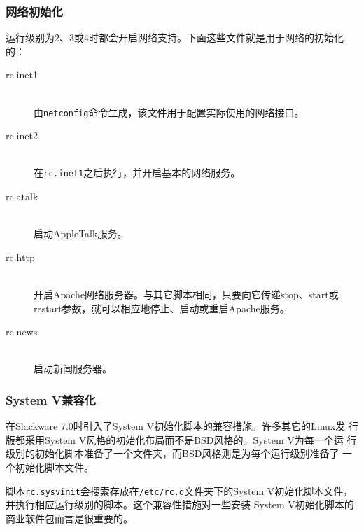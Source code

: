 \subsubsection{网络初始化}
\label{sec:systemConfig:systemOverview:etcRcd:networkInit}

运行级别为2、3或4时都会开启网络支持。下面这些文件就是用于网络的初始化
的：

\begin{description}
\item[rc.inet1] \hfill \\
  由\texttt{netconfig}命令生成，该文件用于配置实际使用的网络接口。
\item[rc.inet2] \hfill \\
  在\texttt{rc.inet1}之后执行，并开启基本的网络服务。
\item[rc.atalk] \hfill \\
  启动AppleTalk服务。
\item[rc.http] \hfill \\
  开启Apache网络服务器。与其它脚本相同，只要向它传递stop、start或
  restart参数，就可以相应地停止、启动或重启Apache服务。
\item[rc.news] \hfill \\
  启动新闻服务器。
\end{description}


\subsubsection{System V兼容化}
\label{sec:systemConfig:systemOverview:etcRcd:systemVCompatibilily}

在Slackware 7.0时引入了System V初始化脚本的兼容措施。许多其它的Linux发
行版都采用System V风格的初始化布局而不是BSD风格的。System V为每一个运
行级别的初始化脚本准备了一个文件夹，而BSD风格则是为每个运行级别准备了
一个初始化脚本文件。

脚本\texttt{rc.sysvinit}会搜索存放在\texttt{/etc/rc.d}文件夹下的System
V初始化脚本文件，并执行相应运行级别的脚本。这个兼容性措施对一些安装
System V初始化脚本的商业软件包而言是很重要的。

